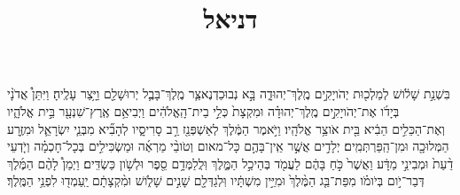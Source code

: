 \documentclass{openreader}
\title{דניאל}
\date{}
\begin{document}
\maketitle
\raggedbottom 
\fontsize{16pt}{24pt}\selectfont


בִּשְׁנַ֣ת שָׁלֹ֔ושׁ לְמַלְכ֖וּת יְהֹויָקִ֣ים מֶֽלֶךְ־יְהוּדָ֑ה בָּ֣א נְבוּכַדְנֶאצַּ֧ר מֶֽלֶךְ־בָּבֶ֛ל יְרוּשָׁלִַ֖ם וַיָּ֥צַר עָלֶֽיהָ׃ 
וַיִּתֵּן֩ אֲדֹנָ֨י בְּיָדֹ֜ו אֶת־יְהֹויָקִ֣ים מֶֽלֶךְ־יְהוּדָ֗ה וּמִקְצָת֙ כְּלֵ֣י בֵית־הָֽאֱלֹהִ֔ים וַיְבִיאֵ֥ם אֶֽרֶץ־שִׁנְעָ֖ר בֵּ֣ית אֱלֹהָ֑יו וְאֶת־הַכֵּלִ֣ים הֵבִ֔יא בֵּ֖ית אֹוצַ֥ר אֱלֹהָֽיו׃ 
וַיֹּ֣אמֶר הַמֶּ֔לֶךְ לְאַשְׁפְּנַ֖ז רַ֣ב סָרִיסָ֑יו לְהָבִ֞יא מִבְּנֵ֧י יִשְׂרָאֵ֛ל וּמִזֶּ֥רַע הַמְּלוּכָ֖ה וּמִן־הַֽפַּרְתְּמִֽים׃ 
יְלָדִ֣ים אֲשֶׁ֣ר אֵֽין־בָּהֶ֣ם כָּל־מאום וְטֹובֵ֨י מַרְאֶ֜ה וּמַשְׂכִּילִ֣ים בְּכָל־חָכְמָ֗ה וְיֹ֤דְעֵי דַ֨עַת֙ וּמְבִינֵ֣י מַדָּ֔ע וַאֲשֶׁר֙ כֹּ֣חַ בָּהֶ֔ם לַעֲמֹ֖ד בְּהֵיכַ֣ל הַמֶּ֑לֶךְ וּֽלֲלַמְּדָ֥ם סֵ֖פֶר וּלְשֹׁ֥ון כַּשְׂדִּֽים׃ 
וַיְמַן֩ לָהֶ֨ם הַמֶּ֜לֶךְ דְּבַר־יֹ֣ום בְּיֹומֹ֗ו מִפַּת־בַּ֤ג הַמֶּ֨לֶךְ֙ וּמִיֵּ֣ין מִשְׁתָּ֔יו וּֽלְגַדְּלָ֖ם שָׁנִ֣ים שָׁלֹ֑ושׁ וּמִ֨קְצָתָ֔ם יַֽעַמְד֖וּ לִפְנֵ֥י הַמֶּֽלֶךְ׃ 
\end{document}
